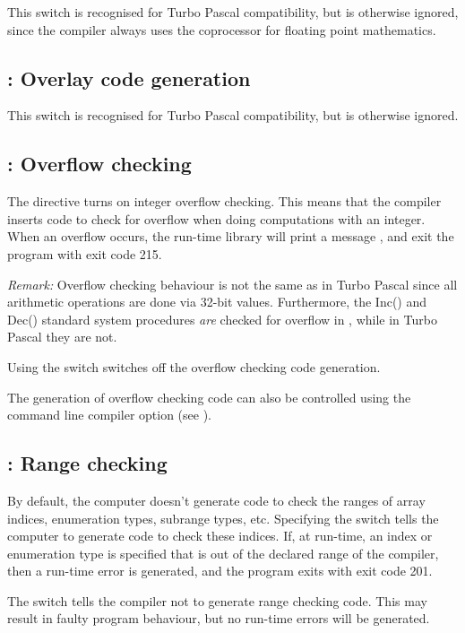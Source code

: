 \documentclass{report}
\begin{document}
This switch is recognised for Turbo Pascal compatibility, but is otherwise
ignored, since the compiler always uses the coprocessor for floating point
mathematics.

\subsection{ : Overlay code generation }

This switch is recognised for Turbo Pascal compatibility, but is otherwise
ignored.

\subsection{ : Overflow checking}
The  directive turns on integer overflow checking.
This means that the compiler inserts code to check for overflow when doing
computations with an integer.
When an overflow occurs, the run-time library will print a message
, and exit the program with exit code 215.

\emph{ Remark: } Overflow checking behaviour is not the same as in
Turbo Pascal since all arithmetic operations are done via 32-bit
values. Furthermore, the Inc() and Dec() standard system procedures
\emph{ are } checked for overflow in \fpc, while in Turbo Pascal they
are not.

Using the  switch switches off the overflow checking code
generation.

The generation of overflow checking code can also be controlled
using the  command line compiler option (see \userref).

\subsection{ : Range checking}
By default, the computer doesn't generate code to check the ranges of array
indices, enumeration types, subrange types, etc. Specifying the
 switch tells the computer to generate code to check these
indices. If, at run-time, an index or enumeration type is specified that is
out of the declared range of the compiler, then a run-time error is
generated, and the program exits with exit code 201.

The  switch tells the compiler not to generate range checking
code. This may result in faulty program behaviour, but no run-time errors
will be generated.
\end{document}
